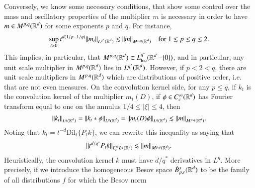 %
%
%
%
Conversely, we know some necessary conditions, that show some control over the mass and oscillatory properties of the multiplier $m$ is necessary in order to have $m \in M^{p,q}(\operatorname{\mathbb{R}}^d)$ for some exponents $p$ and $q$. For instance,
%
\[ \sup_{t > 0} t^{d(1/p - 1/q)} \| m_t \|_{L^{q^*}(\operatorname{\mathbb{R}}^d)} \lesssim \| m \|_{M^{p,q}(\operatorname{\mathbb{R}}^d)} \quad\text{for $1 \leq p \leq q \leq 2$}. \]
%
This implies, in particular, that $M^{p,q}(\operatorname{\mathbb{R}}^d) \subset L^{q^*}_{\text{loc}}(\operatorname{\mathbb{R}}^d - \{ 0 \})$, and in particular, any unit scale multiplier in $M^{p,q}(\operatorname{\mathbb{R}}^d)$ lies in $L^{q^*}(\operatorname{\mathbb{R}}^d)$. However, if $p < 2 < q$, there are unit scale multipliers in $M^{p,q}(\operatorname{\mathbb{R}}^d)$ which are distributions of positive order, i.e. that are not even measures. On the convolution kernel side, for any $p \leq q$, if $k_t$ is the convolution kernel of the multiplier $m_t(D)$, if $\phi \in C_c^\infty(\operatorname{\mathbb{R}}^d)$ has Fourier transform equal to one on the annulus $1/4 \leq |\xi| \leq 4$, then
%
\[ \| k_t \|_{L^q(\operatorname{\mathbb{R}}^d)} = \| k_t * \phi \|_{L^q(\operatorname{\mathbb{R}}^d)} = \| m_t(D) \phi \|_{L^q(\operatorname{\mathbb{R}}^d)} \lesssim \| m \|_{M^{p,q}(\operatorname{\mathbb{R}}^d)}. \]
%
Noting that $k_t = t^{-d} \text{Dil}_t \{ P_t k \}$, we can rewrite this inequality as saying that
%
\[ \| t^{d/q^*} P_t k \|_{L^\infty_t L^q(\operatorname{\mathbb{R}}^d)} \lesssim \| m \|_{M^{p,q}(\operatorname{\mathbb{R}}^d)}. \]
%
Heuristically, the convolution kernel $k$ must have $d/q^*$ derivatives in $L^q$. More precisely, if we introduce the homogeneous Besov space $\dot{B}^s_{p,r}(\operatorname{\mathbb{R}}^d)$ to be the family of all distributions $f$ for which the Besov norm
